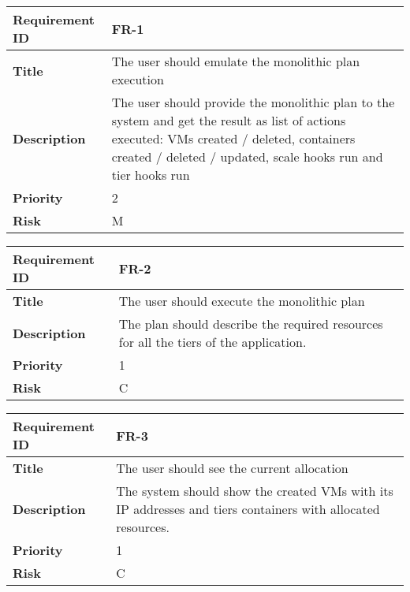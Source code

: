 \begin{table}[ht]
  \begin{tabular}{|p{3.5cm}|p{8cm}|}
  \hline
    \textbf{Requirement ID}  & FR-1 \\
  \hline
    \textbf{Title}  & \begin{sloppypar}The user should emulate the monolithic plan execution\end{sloppypar}\\
  \hline
    \textbf{Description}  & \begin{sloppypar}The user should provide the monolithic plan to the system and get the result as list of actions executed: VMs created / deleted, containers created / deleted / updated, scale hooks run and tier hooks run \end{sloppypar}\\
  \hline
    \textbf{Priority}  & 2\\
  \hline
    \textbf{Risk}  & M \\
  \hline
  \end{tabular}
\end{table}

\begin{table}[ht]
  \begin{tabular}{|p{3.5cm}|p{8cm}|}
  \hline
    \textbf{Requirement ID}  & FR-2 \\
  \hline
    \textbf{Title}  & \begin{sloppypar}The user should execute the monolithic plan\end{sloppypar}\\
  \hline
    \textbf{Description}  & \begin{sloppypar}The plan should describe the required resources for all the tiers of the application.\end{sloppypar}\\
  \hline
    \textbf{Priority}  & 1\\
  \hline
    \textbf{Risk}  & C \\
  \hline
  \end{tabular}
\end{table}

\begin{table}[ht]
  \begin{tabular}{|p{3.5cm}|p{8cm}|}
  \hline
    \textbf{Requirement ID}  & FR-3 \\
  \hline
    \textbf{Title}  & \begin{sloppypar}The user should see the current allocation\end{sloppypar}\\
  \hline
    \textbf{Description}  & \begin{sloppypar}The system should show the created VMs with its IP addresses and tiers containers with allocated resources.\end{sloppypar}\\
  \hline
    \textbf{Priority}  & 1\\
  \hline
    \textbf{Risk}  & C \\
  \hline
  \end{tabular}
\end{table}

